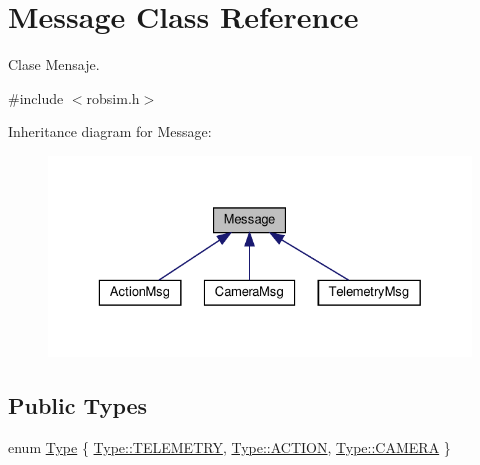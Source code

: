 \hypertarget{classMessage}{}\section{Message Class Reference}
\label{classMessage}


Clase Mensaje.  




{\ttfamily \#include $<$robsim.\+h$>$}



Inheritance diagram for Message\+:\nopagebreak
\begin{figure}[H]
\begin{center}
\leavevmode
\includegraphics[width=329pt]{classMessage__inherit__graph}
\end{center}
\end{figure}
\subsection*{Public Types}
\begin{DoxyCompactItemize}
\item 
enum \hyperlink{classMessage_a1c65ab3f02ba5b175f583f9d275ecf2b}{Type} \{ \hyperlink{classMessage_a1c65ab3f02ba5b175f583f9d275ecf2babb3d2d909c73fe49800949a344775f8b}{Type\+::\+T\+E\+L\+E\+M\+E\+T\+RY}, 
\hyperlink{classMessage_a1c65ab3f02ba5b175f583f9d275ecf2bae58a1b00942e66d8b4abc960da7877ab}{Type\+::\+A\+C\+T\+I\+ON}, 
\hyperlink{classMessage_a1c65ab3f02ba5b175f583f9d275ecf2baddf0d6b21537d984fea6544f58101fa8}{Type\+::\+C\+A\+M\+E\+RA}
 \}
\end{DoxyCompactItemize}
